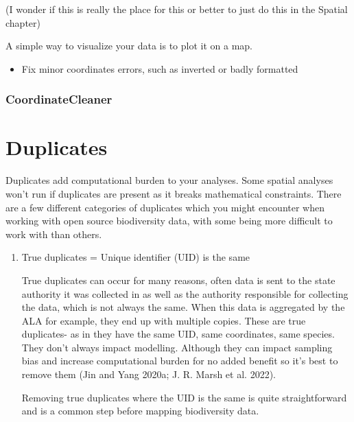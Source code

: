 \documentclass[
  letterpaper,
  DIV=11,
  numbers=noendperiod,
  oneside]{scrreprt}
\providecommand{\tightlist}{%
  \setlength{\itemsep}{0pt}\setlength{\parskip}{0pt}}\usepackage{longtable,booktabs,array}
\begin{document}
(I wonder if this is really the place for this or better to just do this
in the Spatial chapter)

A simple way to visualize your data is to plot it on a map.

\begin{itemize}
\tightlist
\item
  Fix minor coordinates errors, such as inverted or badly formatted
\end{itemize}

\hypertarget{section}{%
\subsection{}\label{section}}

\hypertarget{coordinatecleaner}{%
\subsection{CoordinateCleaner}\label{coordinatecleaner}}


\hypertarget{duplicates}{%
\chapter{Duplicates}\label{duplicates}}

Duplicates add computational burden to your analyses. Some spatial
analyses won't run if duplicates are present as it breaks mathematical
constraints. There are a few different categories of duplicates which
you might encounter when working with open source biodiversity data,
with some being more difficult to work with than others.

\begin{enumerate}
\def\labelenumi{\arabic{enumi}.}
\item
  True duplicates = Unique identifier (UID) is the same

  True duplicates can occur for many reasons, often data is sent to the
  state authority it was collected in as well as the authority
  responsible for collecting the data, which is not always the same.
  When this data is aggregated by the ALA for example, they end up with
  multiple copies. These are true duplicates- as in they have the same
  UID, same coordinates, same species. They don't always impact
  modelling. Although they can impact sampling bias and increase
  computational burden for no added benefit so it's best to remove them
  (Jin and Yang 2020a; J. R. Marsh et al. 2022).

  Removing true duplicates where the UID is the same is quite
  straightforward and is a common step before mapping biodiversity data.
\end{enumerate}
\end{document}
